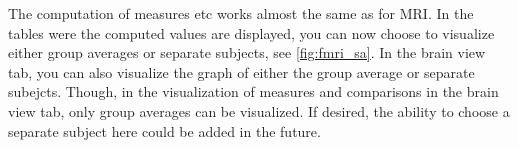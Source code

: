 \documentclass{article}
\begin{document}
The computation of measures etc works almost the same as for MRI. In  the tables were the computed values are displayed, you can now choose to visualize either group averages or separate subjects, see \cref{fig:fmri_sa}. In the brain view tab, you can also visualize the graph of either the group average or separate subejcts. Though, in the visualization of measures and comparisons in the brain view tab, only group averages can be visualized. If desired, the ability to choose a separate subject here could be added in the future.
\end{document}
